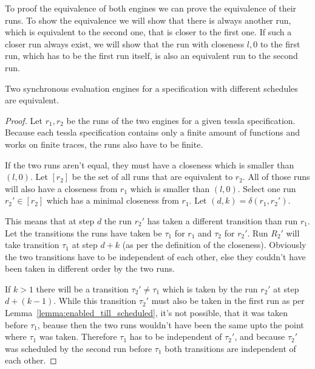 To proof the equivalence of both engines we can prove the equivalence of their runs.
To show the equivalence we will show that there is always another run, which is equivalent to the second one, that is closer to the first one.
If such a closer run always exist, we will show that the run with closeness \(l, 0\) to the first run, which has to be the first run itself, is also an equivalent run to the second run.

\begin{theorem}[name = Equivalence of Different Synchronous Evaluation Engines]\label{theorem:equivalence_sync_eval_engines}
  Two synchronous evaluation engines for a specification with different schedules are equivalent.
\end{theorem}
\begin{proof}

  Let \(r_1, r_2\) be the runs of the two engines for a given \gls{tessla} specification.
  Because each \gls{tessla} specification contains only a finite amount of functions and works on finite traces, the runs also have to be finite.

If the two runs aren't equal, they must have a closeness which is smaller than \((l, 0)\).
Let \([r_2]\) be the set of all runs that are equivalent to \(r_2\).
All of those runs will also have a closeness from \(r_1\) which is smaller than \((l, 0)\).
Select one run \(r_2' \in [r_2]\) which has a minimal closeness from \(r_1\).
Let \((d,k) = \delta(r_1, r_2')\).

This means that at step \(d\) the run \(r_2'\) has taken a different transition than run \(r_1\).
Let the transitions the runs have taken be \(\tau_1\) for \(r_1\) and \(\tau_2\) for \(r_2'\).
Run \(R_2'\) will take transition \(\tau_1\) at step \(d+k\) (as per the definition of the closeness).
Obviously the two transitions have to be independent of each other, else they couldn't have been taken in different order by the two runs.

If \(k > 1\) there will be a transition \(\tau_2' \neq \tau_1\) which is taken by the run \(r_2'\) at step \(d+(k-1)\).
While this transition \(\tau_2'\) must also be taken in the first run as per Lemma~\ref{lemma:enabled_till_scheduled}, it's not possible, that it was taken before \(\tau_1\), beause then the two runs wouldn't have been the same upto the point where \(\tau_1\) was taken.
Therefore \(\tau_1\) has to be independent of \(\tau_2'\), and because \(\tau_2'\) was scheduled by the second run before \(\tau_1\) both transitions are independent of each other.


\end{proof}
